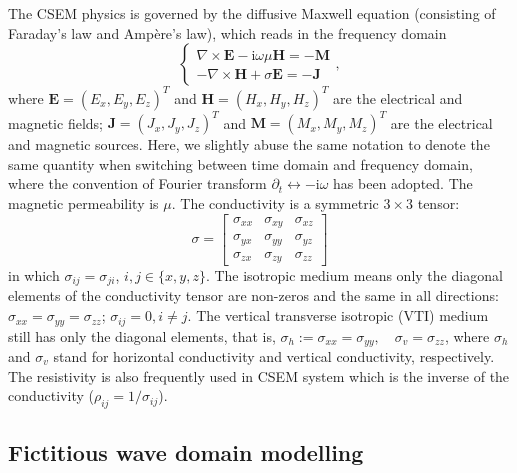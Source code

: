 \documentclass[a4paper,10pt]{article}
\begin{document}
The CSEM physics is governed by the diffusive Maxwell equation (consisting of Faraday's law and Amp\`{e}re's law), which reads in the frequency domain
\begin{equation}
 \begin{cases}
 \nabla \times \mathbf{E} -\mathrm{i}\omega\mu  \mathbf{H} = -\mathbf{M} \\
 -\nabla \times \mathbf{H} +\sigma \mathbf{E}=-\mathbf{J}
 \end{cases},
\end{equation}
where $\mathbf{E}=(E_x,E_y,E_z)^T$ and $\mathbf{H}=(H_x, H_y, H_z)^T$ are the electrical and magnetic fields; $\mathbf{J}=(J_x, J_y, J_z)^T$ and $\mathbf{M}=(M_x, M_y, M_z)^T$ are the electrical and magnetic sources. Here, we slightly abuse the same notation to denote the same quantity when switching between time domain and frequency domain, where the convention of Fourier transform $\partial_t \leftrightarrow -\mathrm{i}\omega$ has been adopted.
The magnetic permeability is $\mu$. The conductivity is a symmetric $3\times 3$ 
tensor:
\begin{equation}
  \sigma = \left[\begin{array}{lll}
    \sigma_{xx} & \sigma_{xy} & \sigma_{xz}\\
    \sigma_{yx} & \sigma_{yy} & \sigma_{yz}\\
    \sigma_{zx} & \sigma_{zy} & \sigma_{zz}
    \end{array}\right]
\end{equation}
in which $ \sigma_{ij}=\sigma_{ji}$, $i,j\in\{x,y,z\}$. The isotropic medium means only the diagonal elements of the conductivity
tensor are non-zeros and the same in all directions:
$\sigma_{xx}=\sigma_{yy}=\sigma_{zz}$; $\sigma_{ij}=0, i\neq j $.
The vertical transverse isotropic (VTI) medium still has only the diagonal 
elements, that is, $ \sigma_h:=\sigma_{xx}=\sigma_{yy},\quad \sigma_v=\sigma_{zz}$, where $\sigma_h$ and $\sigma_v$ stand for horizontal conductivity and vertical conductivity, respectively. The resistivity is also frequently used in CSEM system which is the inverse of the conductivity ($\rho_{ij}=1/\sigma_{ij}$).


\subsection{Fictitious wave domain modelling}
\end{document}
